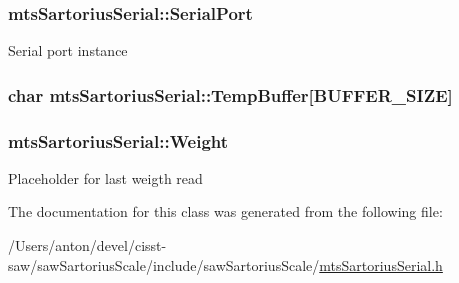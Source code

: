 \subsubsection[{Serial\+Port}]{ mts\+Sartorius\+Serial\+::\+Serial\+Port\hspace{0.3cm}{\ttfamily [protected]}}\label{classmts_sartorius_serial_af266db2d34490ee1fe17c10b8aba6be8}
Serial port instance \hypertarget{classmts_sartorius_serial_a0b786c0a9cf4fbefff9d6727c9f6fd56}{}
\subsubsection[{Temp\+Buffer}]{\setlength{\rightskip}{0pt plus 5cm}char mts\+Sartorius\+Serial\+::\+Temp\+Buffer\mbox{[}{\bf B\+U\+F\+F\+E\+R\+\_\+\+S\+I\+Z\+E}\mbox{]}\hspace{0.3cm}{\ttfamily [protected]}}\label{classmts_sartorius_serial_a0b786c0a9cf4fbefff9d6727c9f6fd56}
\hypertarget{classmts_sartorius_serial_a5fd5e0fcfe8b161a1663059026bcd298}{}
\subsubsection[{Weight}]{ mts\+Sartorius\+Serial\+::\+Weight\hspace{0.3cm}{\ttfamily [protected]}}\label{classmts_sartorius_serial_a5fd5e0fcfe8b161a1663059026bcd298}
Placeholder for last weigth read 

The documentation for this class was generated from the following file\+:\begin{DoxyCompactItemize}
\item 
/\+Users/anton/devel/cisst-\/saw/saw\+Sartorius\+Scale/include/saw\+Sartorius\+Scale/\hyperlink{mts_sartorius_serial_8h}{mts\+Sartorius\+Serial.\+h}\end{DoxyCompactItemize}
